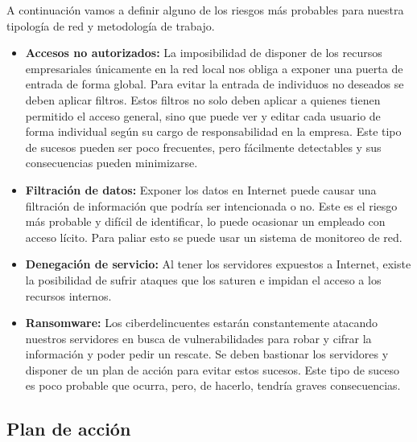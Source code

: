 A continuación vamos a definir alguno de los riesgos más probables para nuestra tipología de red y metodología de trabajo.
\begin{itemize}
    \item \textbf{Accesos no autorizados:} La imposibilidad de disponer de los recursos empresariales únicamente en la red local nos obliga a exponer una puerta de entrada de forma global. Para evitar la entrada de individuos no deseados se deben aplicar filtros. Estos filtros no solo deben aplicar a quienes tienen permitido el acceso general, sino que puede ver y editar cada usuario de forma individual según su cargo de responsabilidad en la empresa. Este tipo de sucesos pueden ser poco frecuentes, pero fácilmente detectables y sus consecuencias pueden minimizarse.%
    \item \textbf{Filtración de datos:} Exponer los datos en Internet puede causar una filtración de información que podría ser intencionada o no. Este es el riesgo más probable y difícil de identificar, lo puede ocasionar un empleado con acceso lícito. Para paliar esto se puede usar un sistema de monitoreo de red.
    \item \textbf{Denegación de servicio:} Al tener los servidores expuestos a Internet, existe la posibilidad de sufrir ataques que los saturen e impidan el acceso a los recursos internos.
    \item \textbf{Ransomware:} Los ciberdelincuentes estarán constantemente atacando nuestros servidores en busca de vulnerabilidades para robar y cifrar la información y poder pedir un rescate. Se deben bastionar los servidores y disponer de un plan de acción para evitar estos sucesos. Este tipo de suceso es poco probable que ocurra, pero, de hacerlo, tendría graves consecuencias.
\end{itemize}
\subsection{Plan de acción}
